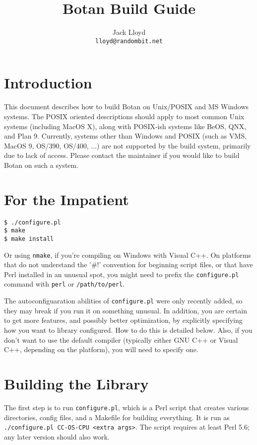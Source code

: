\documentclass{article}
\title{\textbf{Botan Build Guide}}
\author{Jack Lloyd \\
        \texttt{lloyd@randombit.net}}
\date{}
\newcommand{\filename}[1]{\texttt{#1}}
\begin{document}
\maketitle

\tableofcontents

\parskip=5pt
\pagebreak

\section{Introduction}

This document describes how to build Botan on Unix/POSIX and MS
Windows systems. The POSIX oriented descriptions should apply to most
common Unix systems (including MacOS X), along with POSIX-ish systems
like BeOS, QNX, and Plan 9. Currently, systems other than Windows and
POSIX (such as VMS, MacOS 9, OS/390, OS/400, ...) are not supported by
the build system, primarily due to lack of access. Please contact the
maintainer if you would like to build Botan on such a system.

\section{For the Impatient}

\begin{verbatim}
$ ./configure.pl
$ make
$ make install
\end{verbatim}

Or using \verb|nmake|, if you're compiling on Windows with Visual
C++. On platforms that do not understand the '\#!' convention for
beginning script files, or that have Perl installed in an unusual
spot, you might need to prefix the \texttt{configure.pl} command with
\texttt{perl} or \texttt{/path/to/perl}.

The autoconfiguaration abilities of \filename{configure.pl} were only recently
added, so they may break if you run it on something unusual. In addition, you
are certain to get more features, and possibly better optimization, by
explicitly specifying how you want to library configured. How to do this is
detailed below. Also, if you don't want to use the default compiler (typically
either GNU C++ or Visual C++, depending on the platform), you will need to
specify one.

\section{Building the Library}

The first step is to run \filename{configure.pl}, which is a Perl script that
creates various directories, config files, and a Makefile for building
everything. It is run as \verb|./configure.pl CC-OS-CPU <extra args>|. The
script requires at least Perl 5.6; any later version should also work.
\end{document}
